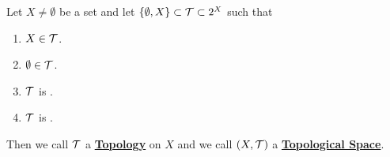 
\newcommand{\scTopologicalSpace}[2]{
    \pa{#1, \scTopology{#1}{#2}}
}
\newcommand{\scTopology}[2]{
    #2_{#1}
}
\newcommand{\TopologicalSpace}[0]{\textbf{\hyperref[def:TopologicalSpace]{Topological Space}}\xspace}
\newcommand{\Topology}[0]{\textbf{\hyperref[def:TopologicalSpace]{Topology}}\xspace}
\newcommand{\TopologicalSpaces}[0]{\textbf{\hyperref[def:TopologicalSpace]{Topological Spaces}}\xspace}
\newcommand{\Topologies}[0]{\textbf{\hyperref[def:TopologicalSpace]{Topologies}}\xspace}

\begin{df}
    \label{def:TopologicalSpace}
    Let $X \neq \emptyset$ be a set 
    and let $\{\emptyset, X\} \subset \mathcal{T} \subset 2^X$ such that
    \begin{enumerate}[label=(\roman*), ref={\ref{def:TopologicalSpace}~/roman*}]
    \item \label{def:TopologicalSpace:ContainsX} $X \in \mathcal{T}$. 
    \item \label{def:TopologicalSpace:ContainsEmptyset} $\emptyset \in \mathcal{T}$. 
    \item \label{def:TopologicalSpace:ClosureUnderUnions} $\mathcal{T}$ is 
    \ClosedUnderArbitraryUnions.
    \item \label{def:TopologicalSpace:ClosureUnderFiniteIntersections} $\mathcal{T}$
    is \ClosedUnderFiniteIntersections. 
    \end{enumerate}
    Then we call $\mathcal{T}$ a \Topology on $X$ and we call 
    $(X,\mathcal{T})$ a \TopologicalSpace. 
\end{df}



